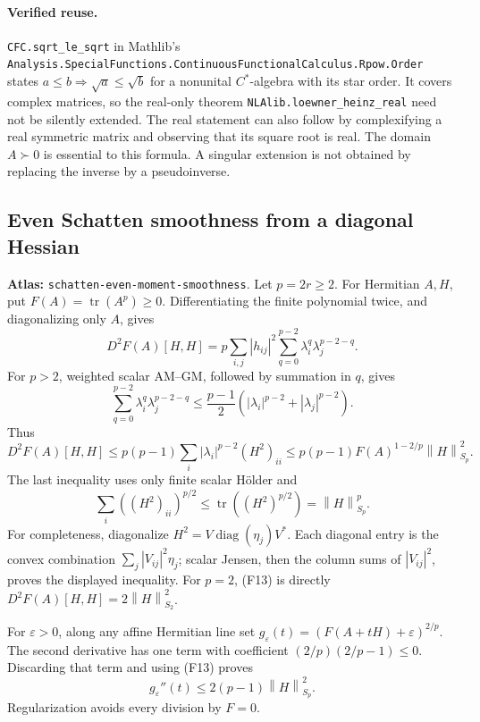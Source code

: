 \documentclass[11pt,a4paper]{article}
\newcommand{\norm}[1]{\left\lVert#1\right\rVert}
\DeclareMathOperator{\tr}{tr}
\DeclareMathOperator{\diag}{diag}
\DeclareRobustCommand{\code}[1]{{\footnotesize\urlstyle{tt}\nolinkurl{#1}}}
\begin{document}
\paragraph{Verified reuse.}
\code{CFC.sqrt_le_sqrt} in Mathlib's
\code{Analysis.SpecialFunctions.ContinuousFunctionalCalculus.Rpow.Order}
states $a\le b\Rightarrow\sqrt a\le\sqrt b$ for a nonunital
$C^*$-algebra with its star order. It covers complex matrices, so the
real-only theorem \code{NLAlib.loewner_heinz_real} need not be silently
extended. The real statement can also follow by complexifying a real
symmetric matrix and observing that its square root is real.
The domain $A\succ0$ is essential to this formula. A singular extension
is not obtained by replacing the inverse by a pseudoinverse.

\subsection{Even Schatten smoothness from a diagonal Hessian}
\label{sec:schatten-even-moment-smoothness}
\textbf{Atlas:} \code{schatten-even-moment-smoothness}.
Let $p=2r\ge2$. For Hermitian $A,H$, put $F(A)=\tr(A^p)\ge0$.
Differentiating the finite polynomial twice, and diagonalizing only $A$,
gives
\[
 D^2F(A)[H,H]=p\sum_{i,j}|h_{ij}|^2
       \sum_{q=0}^{p-2}\lambda_i^q\lambda_j^{p-2-q}.             \tag{F12}
\]
For $p>2$, weighted scalar AM--GM, followed by summation in $q$, gives
\[
 \sum_{q=0}^{p-2}\lambda_i^q\lambda_j^{p-2-q}
 \le\frac{p-1}{2}(|\lambda_i|^{p-2}+|\lambda_j|^{p-2}).
\]
Thus
\[
 D^2F(A)[H,H]\le p(p-1)\sum_i|\lambda_i|^{p-2}(H^2)_{ii}
 \le p(p-1)F(A)^{1-2/p}\norm H_{S_p}^2.                       \tag{F13}
\]
The last inequality uses only finite scalar H\"older and
\[
 \sum_i((H^2)_{ii})^{p/2}\le\tr((H^2)^{p/2})=\norm H_{S_p}^{p}.
\]
For completeness, diagonalize $H^2=V\diag(\eta_j)V^*$. Each diagonal
entry is the convex combination $\sum_j|V_{ij}|^2\eta_j$; scalar Jensen,
then the column sums of $|V_{ij}|^2$, proves the displayed inequality.
For $p=2$, (F13) is directly $D^2F(A)[H,H]=2\norm H_{S_2}^2$.

For $\varepsilon>0$, along any affine Hermitian line set
$g_\varepsilon(t)=(F(A+tH)+\varepsilon)^{2/p}$. The second derivative
has one term with coefficient $(2/p)(2/p-1)\le0$. Discarding that term
and using (F13) proves
\[
                     g_\varepsilon''(t)\le2(p-1)\norm H_{S_p}^2.
                                                                    \tag{F14}
\]
Regularization avoids every division by $F=0$.
\end{document}
